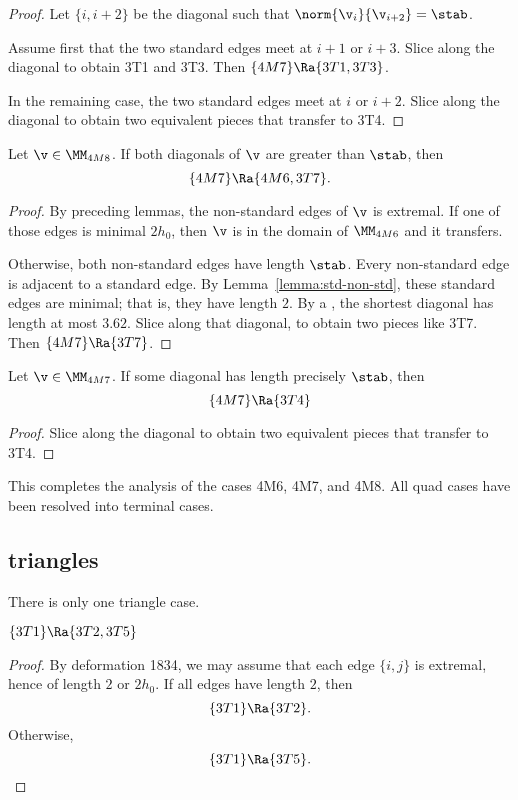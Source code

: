 \begin{proof} Let $\{i,i+2\}$ be the diagonal such that $\norm{\v_i}{\v_{i+2}} = \stab$.

Assume first that the two standard edges meet at $i+1$ or $i+3$.
Slice along the diagonal to obtain 3T1 and 3T3.  Then $\{4M7\}\Ra\{3T1,3T3\}$.

In the remaining case, the two standard edges meet at $i$ or $i+2$.
Slice along the diagonal to obtain two equivalent pieces that transfer to 3T4.
\end{proof}

\begin{lemma}[]
Let $\v\in \MM_{4M8}$.  If both diagonals of $\v$ are greater than $\stab$, then
\[
\{4M7\}\Ra \{4M6,3T7\}.
\]
\end{lemma}

\begin{proof}
By preceding lemmas, the non-standard edges of $\v$ is extremal.  If one of those
edges is minimal $2h_0$, then $\v$ is in the domain of $\MM_{4M6}$ and it transfers.

Otherwise, both non-standard edges have length $\stab$.  Every non-standard edge
is adjacent to a standard edge.  By Lemma~\ref{lemma:std-non-std}, these standard edges
are minimal; that is, they have length $2$.  By a , the shortest diagonal has length
at most $3.62$.  Slice along that diagonal, to obtain two pieces like 3T7.
Then $\{4M7\}\Ra\{3T7\}$.
\end{proof}

\begin{lemma}[]
Let $\v\in \MM_{4M7}$.  If some diagonal has length precisely $\stab$, then
\[
\{4M7\}\Ra \{3T4\}
\]
\end{lemma}

\begin{proof} 
Slice along the diagonal to obtain two equivalent pieces that transfer to 3T4.
\end{proof}


This completes the analysis of the cases 4M6, 4M7, and 4M8.  
All quad cases have been resolved into terminal cases.



\subsection{triangles}


There is only one triangle case.

\begin{lemma}[]
$\{3T1\}\Ra \{3T2,3T5\}$
\end{lemma}

\begin{proof} By deformation 1834,  we may assume that each edge $\{i,j\}$ is extremal, hence
of length $2$ or $2h_0$.  If all edges have length $2$, then
\[
\{3T1\}\Ra\{3T2\}.
\]
Otherwise,
\[
\{3T1\}\Ra\{3T5\}.
\]
\end{proof}

